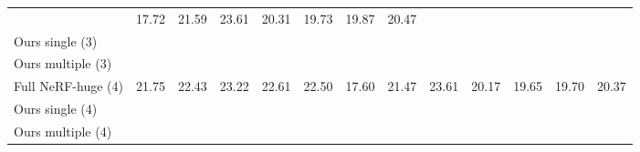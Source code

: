 \begin{table*}[ht!]
{\begin{tabular}{l|*{5}{c}|*{7}{c}|}
                            & 17.72 & 21.59 & 23.61 & 20.31 & 19.73 & 19.87 & \multicolumn{1}{|c|}{20.47} \\
        Ours single (3)         & \cellcolor{yellow!50}{21.04} & \cellcolor{yellow!50}{21.93} & \cellcolor{yellow!50}{23.19} & \cellcolor{yellow!50}{22.51} & \multicolumn{1}{|c|}{\cellcolor{yellow!50}{22.17}}
                                & \cellcolor{yellow!50}{17.79} & \cellcolor{yellow!50}{22.00} & \cellcolor{yellow!50}{23.63} & \cellcolor{yellow!50}{20.44} & \cellcolor{yellow!50}{19.82} & \cellcolor{yellow!50}{19.87} & \multicolumn{1}{|c|}{\cellcolor{yellow!50}{20.54}} \\
        Ours multiple (3)   & \cellcolor{orange!50}{21.11} & \cellcolor{orange!50}{22.17} & \cellcolor{orange!50}{23.41} & \cellcolor{orange!50}{22.58} & \multicolumn{1}{|c|}{\cellcolor{orange!50}{22.32}}
                            & \cellcolor{orange!50}{18.19} & \cellcolor{orange!50}{22.01} & \cellcolor{orange!50}{23.75} & \cellcolor{orange!50}{20.53} & \cellcolor{orange!50}{20.00} & \cellcolor{orange!50}{20.14} & \multicolumn{1}{|c|}{\cellcolor{orange!50}{20.68}} \\
        \hline
        Full NeRF-huge (4)  & 21.75 & 22.43 & 23.22 & 22.61 & \multicolumn{1}{|c|}{22.50}
                            & 17.60 & 21.47 & 23.61 & 20.17 & 19.65 & 19.70 & \multicolumn{1}{|c|}{20.37} \\
        Ours single (4)         & \cellcolor{yellow!50}{21.93} & \cellcolor{yellow!50}{22.42} & \cellcolor{yellow!50}{23.31} & \cellcolor{yellow!50}{22.63} & \multicolumn{1}{|c|}{\cellcolor{yellow!50}{22.57}}
                                & \cellcolor{yellow!50}{17.72} & \cellcolor{yellow!50}{21.48} & \cellcolor{yellow!50}{23.66} & \cellcolor{yellow!50}{20.34} & \cellcolor{yellow!50}{19.74} & \cellcolor{yellow!50}{19.74} & \multicolumn{1}{|c|}{\cellcolor{yellow!50}{20.46}} \\
        Ours multiple (4)   & \cellcolor{orange!50}{21.99} & \cellcolor{orange!50}{22.62} & \cellcolor{orange!50}{23.53} & \cellcolor{orange!50}{22.69} & \multicolumn{1}{|c|}{\cellcolor{orange!50}{22.71}}
                            & \cellcolor{orange!50}{18.18} & \cellcolor{orange!50}{21.50} & \cellcolor{orange!50}{23.73} & \cellcolor{orange!50}{20.46} & \cellcolor{orange!50}{19.99} & \cellcolor{orange!50}{20.06} & \multicolumn{1}{|c|}{\cellcolor{orange!50}{20.64}} \\
        \end{tabular}
    }
\end{table*}